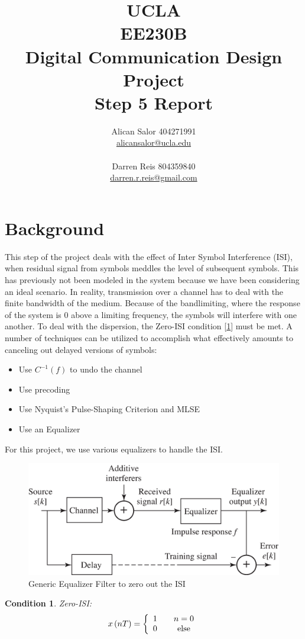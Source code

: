 \documentclass[]{article}
\title{UCLA\\EE230B\\Digital Communication Design Project\\Step 5 Report}
\author{Alican Salor 404271991 \\  \href{mailto:alicansalor@ucla.edu}{alicansalor@ucla.edu} \\ \\
Darren Reis 804359840 \\
\href{mailto:darrer.r.reis@gmail.com}{darren.r.reis@gmail.com} }
\newtheorem{thm}{Condition}
\begin{document}
\maketitle

\newpage
\tableofcontents

\newpage
\section{Background}
\label{sec:background}
This step of the project deals with the effect of Inter Symbol Interference (ISI), when residual signal from symbols meddles the level of subsequent symbols.  This has previously not been modeled in the system because we have been considering an ideal scenario.  In reality, transmission over a channel has to deal with the finite bandwidth of the medium.  Because of the bandlimiting, where the response of the system is 0 above a limiting frequency, the symbols will interfere with one another. To deal with the dispersion, the Zero-ISI condition [\ref{thm:zero}] must be met.  A number of techniques can be utilized to accomplish what effectively amounts to canceling out delayed versions of symbols:

\begin{itemize}
\item Use $C^{-1}\left(f\right)$ to undo the channel
\item Use precoding
\item Use Nyquist's Pulse-Shaping Criterion and MLSE
\item Use an Equalizer
\end{itemize}
For this project, we use various equalizers to handle the ISI.  \\

\begin{figure}[b]
\centering
\includegraphics[width=.6\textwidth]{equalizer.png}
\caption{Generic Equalizer Filter to zero out the ISI\label{fig:equalizer}}
\end{figure}

\begin{thm}
\label{thm:zero}
Zero-ISI:
$$x\left(nT\right) = \left\{
\begin{array}{c c}
1 & \quad n=0 \\
0 & \quad \text{else}
\end{array} \right.$$
\end{thm}
\end{document}
